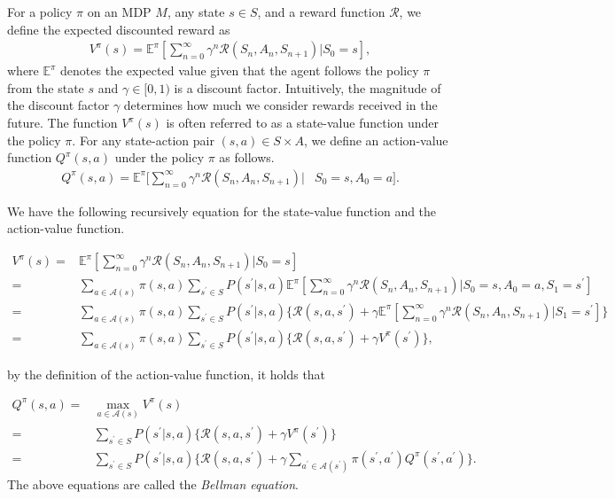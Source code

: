 \begin{definition}
  For a policy $\pi$ on an MDP $M$, any state $s \in S$, and a reward function $\mathcal{R}$, we define the expected discounted reward as
  \begin{align*}
    V^{\pi}(s)= \mathbb{E}^{\pi}[\sum_{n=0}^{\infty}\gamma^n \mathcal{R}(S_n, A_n, S_{n+1})|S_0 = s],
  \end{align*}
where $\mathbb{E}^{\pi}$ denotes the expected value given that the agent follows the policy $\pi$ from the state $s$ and $\gamma \in [0,1)$ is a discount factor. Intuitively, the magnitude of the discount factor $\gamma$ determines how much we consider rewards received in the future. The function $V^{\pi}(s)$ is often referred to as a state-value function under the policy $\pi$. For any state-action pair $(s,a) \in S \times A$, we define an action-value function $Q^{\pi}(s,a)$ under the policy $\pi$ as follows.
  \begin{align*}
    Q^{\pi}(s,a)= \mathbb{E}^{\pi}[\sum_{n=0}^{\infty}\gamma^n \mathcal{R}(S_n, A_n, S_{n+1})|&S_0 = s, A_0 = a].
  \end{align*}

  We have the following recursively equation for the state-value function and the action-value function.

  \begin{align}
    V^{\pi}(s) = & \mathbb{E}^{\pi}[\sum_{n=0}^{\infty}\gamma^n \mathcal{R}(S_n, A_n, S_{n+1})|S_0 = s] \nonumber \\
     = & \sum_{a \in \mathcal{A}(s)} \pi(s,a) \sum_{s^{\prime} \in S} P(s^{\prime}|s,a) \mathbb{E}^{\pi}[\sum_{n=0}^{\infty}\gamma^n \mathcal{R}(S_n, A_n, S_{n+1})|S_0 = s, A_0 = a, S_1 = s^{\prime}] \nonumber \\
     = & \sum_{a \in \mathcal{A}(s)} \pi(s,a) \sum_{s^{\prime} \in S} P(s^{\prime}|s,a) \{ \mathcal{R}(s, a, s^{\prime}) + \gamma \mathbb{E}^{\pi}[\sum_{n=0}^{\infty}\gamma^n \mathcal{R}(S_n, A_n, S_{n+1})|S_1 = s^{\prime}] \} \nonumber \\
    = & \sum_{a \in \mathcal{A}(s)} \pi(s,a) \sum_{s^{\prime} \in S} P(s^{\prime}|s,a) \{ \mathcal{R}(s, a, s^{\prime}) + \gamma V^{\pi}(s^{\prime}) \},
    \label{V_pi}
  \end{align}
\end{definition}

by the definition of the action-value function, it holds that

\begin{align}
  Q^{\pi}(s,a) = & \max_{a \in \mathcal{A}(s)}V^{\pi}(s) \nonumber \\
               = & \sum_{s^{\prime} \in S} P(s^{\prime}|s,a) \{ \mathcal{R}(s, a, s^{\prime}) + \gamma V^{\pi}(s^{\prime}) \} \nonumber \\
               = & \sum_{s^{\prime} \in S} P(s^{\prime}|s,a) \{ \mathcal{R}(s, a, s^{\prime}) + \gamma \sum_{a^{\prime} \in \mathcal{A}(s^{\prime})} \pi(s^{\prime}, a^{\prime}) Q^{\pi}(s^{\prime},a^{\prime}) \}.
 \label{Q_pi}
\end{align}
 The above equations are called the {\it Bellman equation}.


